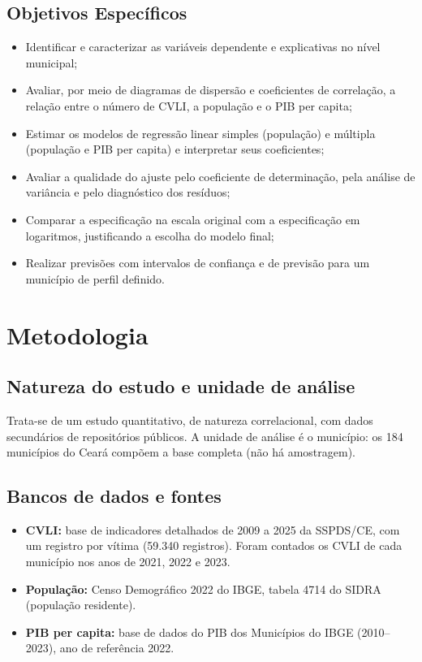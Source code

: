 \documentclass[12pt,a4paper]{article}
\begin{document}
	\subsection{Objetivos Específicos}
	
	\begin{itemize}
		\item Identificar e caracterizar as variáveis dependente e explicativas no nível municipal;
		\item Avaliar, por meio de diagramas de dispersão e coeficientes de correlação, a relação entre o número de CVLI, a população e o PIB per capita;
		\item Estimar os modelos de regressão linear simples (população) e múltipla (população e PIB per capita) e interpretar seus coeficientes;
		\item Avaliar a qualidade do ajuste pelo coeficiente de determinação, pela análise de variância e pelo diagnóstico dos resíduos;
		\item Comparar a especificação na escala original com a especificação em logaritmos, justificando a escolha do modelo final;
		\item Realizar previsões com intervalos de confiança e de previsão para um município de perfil definido.
	\end{itemize}
	
	\newpage
	
	\section{Metodologia}
	
	\subsection{Natureza do estudo e unidade de análise}
	
	Trata-se de um estudo quantitativo, de natureza correlacional, com dados secundários de repositórios públicos. A unidade de análise é o município: os 184 municípios do Ceará compõem a base completa (não há amostragem).
	
	\subsection{Bancos de dados e fontes}
	
	\begin{itemize}
		\item \textbf{CVLI:} base de indicadores detalhados de 2009 a 2025 da SSPDS/CE, com um registro por vítima (59.340 registros). Foram contados os CVLI de cada município nos anos de 2021, 2022 e 2023.
		\item \textbf{População:} Censo Demográfico 2022 do IBGE, tabela 4714 do SIDRA (população residente).
		\item \textbf{PIB per capita:} base de dados do PIB dos Municípios do IBGE (2010--2023), ano de referência 2022.
	\end{itemize}
	
\end{document}
